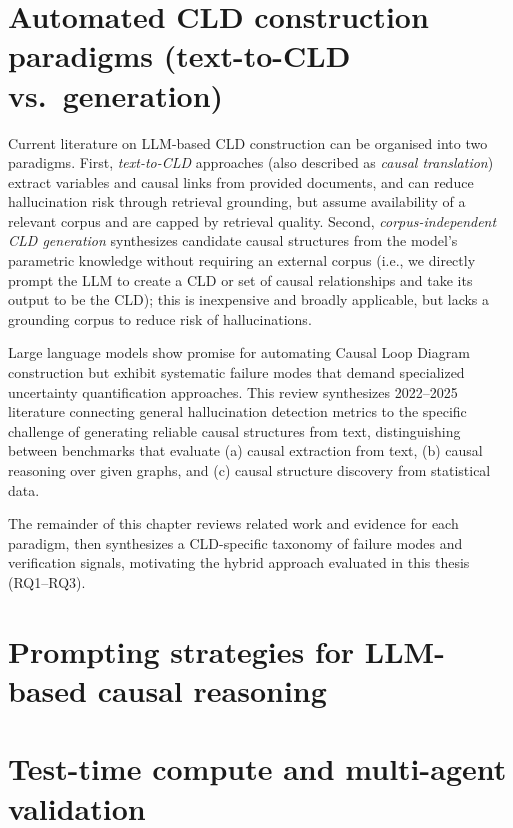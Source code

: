 \section{Automated CLD construction paradigms (text-to-CLD vs.\ generation)}
\label{sec:lit_landscape}

Current literature on LLM-based CLD construction can be organised into two paradigms. First, \emph{text-to-CLD} approaches (also described as \emph{causal translation}) extract variables and causal links from provided documents, and can reduce hallucination risk through retrieval grounding, but assume availability of a relevant corpus and are capped by retrieval quality. Second, \emph{corpus-independent CLD generation} synthesizes candidate causal structures from the model's parametric knowledge without requiring an external corpus (i.e., we directly prompt the LLM to create a CLD or set of causal relationships and take its output to be the CLD); this is inexpensive and broadly applicable, but lacks a grounding corpus to reduce risk of hallucinations.

Large language models show promise for automating Causal Loop Diagram construction but exhibit systematic failure modes that demand specialized uncertainty quantification approaches. This review synthesizes 2022--2025 literature connecting general hallucination detection metrics to the specific challenge of generating reliable causal structures from text, distinguishing between benchmarks that evaluate (a) causal extraction from text, (b) causal reasoning over given graphs, and (c) causal structure discovery from statistical data.

The remainder of this chapter reviews related work and evidence for each paradigm, then synthesizes a CLD-specific taxonomy of failure modes and verification signals, motivating the hybrid approach evaluated in this thesis (RQ1--RQ3).



\section{Prompting strategies for LLM-based causal reasoning}
\label{sec:lit_prompting}






\section{Test-time compute and multi-agent validation}
\label{sec:lit_test_time_compute}

